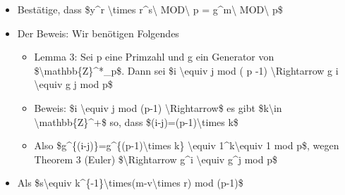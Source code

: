 \documentclass[a4paper]{article}
\begin{document}
\begin{multicols}{3}
\begin{itemize}
              \begin{itemize}
                  \item
                        Bestätige, dass \$y\^{}r \textbackslash times r\^{}s\textbackslash{}
                        MOD\textbackslash{} p = g\^{}m\textbackslash{} MOD\textbackslash{}
                        p\$
                  \item
                        Der Beweis: Wir benötigen Folgendes

                        \begin{itemize}
                            \item
                                  Lemma 3: Sei p eine Primzahl und g ein Generator von
                                  \$\textbackslash mathbb\{Z\}\^{}*\_p\$. Dann sei \$i
                                  \textbackslash equiv j mod ( p -1) \textbackslash Rightarrow g i
                                  \textbackslash equiv g j mod p\$
                            \item
                                  Beweis: \$i \textbackslash equiv j mod (p-1)
                                  \textbackslash Rightarrow\$ es gibt \$k\textbackslash in
                                  \textbackslash mathbb\{Z\}\^{}+\$ so, dass
                                  \$(i-j)=(p-1)\textbackslash times k\$
                            \item
                                  Also \$g\^{}\{(i-j)\}=g\^{}\{(p-1)\textbackslash times k\}
                                  \textbackslash equiv 1\^{}k\textbackslash equiv 1 mod p\$, wegen
                                  Theorem 3 (Euler) \$\textbackslash Rightarrow g\^{}i
                                  \textbackslash equiv g\^{}j mod p\$
                        \end{itemize}
                  \item
                        Als \$s\textbackslash equiv
                        k\^{}\{-1\}\textbackslash times(m-v\textbackslash times r) mod
                        (p-1)\$


\end{itemize}
\end{itemize}
\end{multicols}
\end{document}
